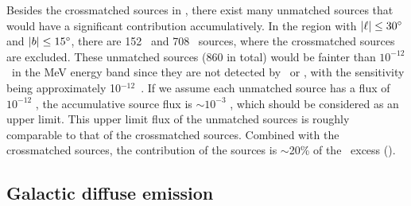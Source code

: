 \documentclass[a4paper,11pt]{article}
\begin{document}
Besides the crossmatched sources in \cite{tsuji_cross-match_2021}, there exist many unmatched sources that would have a significant contribution accumulatively.
In the region with $|\ell| \leq 30\hbox{$^\circ$}$ and $|b| \leq 15\hbox{$^\circ$}$, there are 152 \bat\ and 708 \lat\ sources, where the crossmatched sources are excluded.
These unmatched sources (860 in total) would be fainter than $10^{-12}$ \flux\ in the MeV energy band since they are not detected by \bat\ or \lat, with the sensitivity being approximately 10$^{-12}$~\flux.
If we assume each unmatched source has a flux of  $10^{-12}$ \flux,
the accumulative source flux is $\sim 10^{-3}$ \Mflux, 
which should be considered as an upper limit.
This upper limit flux of the unmatched sources is roughly comparable to that of the crossmatched sources.
Combined with the crossmatched sources, the contribution of the sources is $\sim$20\% of the \comptel\ excess ().




\subsection{Galactic diffuse emission}
\label{sec:gde}
\end{document}
